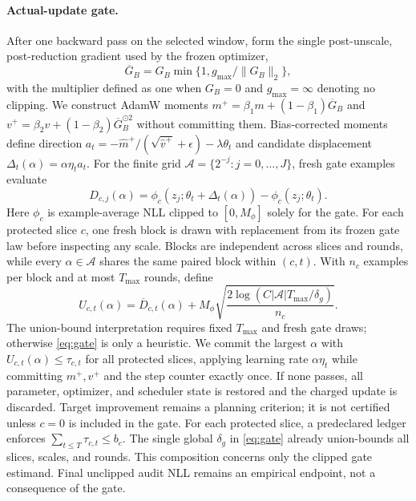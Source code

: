 \documentclass{article}
\begin{document}
\paragraph{Actual-update gate.}
After one backward pass on the selected window, form the single post-unscale,
post-reduction gradient used by the frozen optimizer,
\begin{equation}
\overline G_B=G_B\min\{1,g_{\max}/\|G_B\|_2\},
\end{equation}
with the multiplier defined as one when $G_B=0$ and
$g_{\max}=\infty$ denoting no clipping. We construct AdamW moments
$m^+=\beta_1m+(1-\beta_1)\overline G_B$ and
$v^+=\beta_2v+(1-\beta_2)\overline G_B^{\odot2}$ without committing them. Bias-corrected
moments define direction
$a_t=-\widehat m^+/(\sqrt{\widehat v^+}+\epsilon)-\lambda\theta_t$ and candidate
displacement $\Delta_t(\alpha)=\alpha\eta_ta_t$. For the finite grid
$\mathcal A=\{2^{-j}:j=0,\ldots,J\}$, fresh gate examples evaluate
\begin{equation}
D_{c,j}(\alpha)=
\phi_c(z_j;\theta_t+\Delta_t(\alpha))-
\phi_c(z_j;\theta_t).
\end{equation}
Here $\phi_c$ is example-average NLL clipped to $[0,M_\phi]$ solely for the
gate. For each protected slice $c$, one fresh block is drawn with replacement
from its frozen gate law before inspecting any scale. Blocks are independent
across slices and rounds, while every $\alpha\in\mathcal A$ shares the same
paired block within $(c,t)$. With $n_c$ examples per block and at most
$T_{\max}$ rounds, define
\begin{equation}
U_{c,t}(\alpha)=\overline D_{c,t}(\alpha)+
M_\phi\sqrt{\frac{2\log(C|\mathcal A|T_{\max}/\delta_g)}{n_c}}.
\label{eq:gate}
\end{equation}
The union-bound interpretation requires fixed $T_{\max}$ and fresh gate draws;
otherwise \cref{eq:gate} is only a heuristic. We commit the largest $\alpha$
with $U_{c,t}(\alpha)\le\tau_{c,t}$ for all protected slices, applying learning
rate $\alpha\eta_t$ while committing $m^+,v^+$ and the step counter exactly
once. If none passes, all parameter, optimizer, and scheduler state is restored
and the charged update is discarded. Target improvement remains a planning
criterion; it is not certified unless $c=0$ is included in the gate.
For each protected slice, a predeclared ledger enforces
$\sum_{t\le T}\tau_{c,t}\le b_c$. The single global $\delta_g$ in
\cref{eq:gate} already union-bounds all slices, scales, and rounds. This
composition concerns only the clipped gate estimand. Final unclipped audit NLL
remains an empirical endpoint, not a consequence of the gate.
\end{document}
